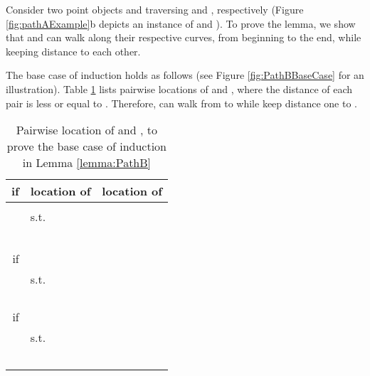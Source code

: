 \documentclass[12pt]{dalthesis}
\def\favoritefont{\bfseries \sffamily}
\def\QED{\ensuremath{{\Box}}}
\def\markatright#1{\leavevmode\unskip\nobreak\quad\hspace*{\fill}{#1}}
\newenvironment{proof}
	{\begin{trivlist}\item[\hskip\labelsep{\favoritefont Proof:}]}
	{\markatright{\QED}\end{trivlist}}
\begin{document}
\begin{proof}



Consider two point objects  and  
traversing  and , respectively (Figure \ref{fig:pathAExample}b depicts an instance of  and ).
To prove the lemma, we show that  and  can walk along
their respective curves, from beginning to
the end, while keeping distance  to each other. 

The base case of induction holds as follows 
(see Figure \ref{fig:PathBBaseCase} for an illustration).
Table \ref{tab:BaseCasePathB} lists  pairwise locations of 
 and , where the distance of each pair is less or equal to .
Therefore,  can walk from  to  while
keep distance one to .

\begin{table}[h]
\centering
\begin{tabular}{ r | l | l  }
if    & location of  & location of   
 \\
\hline
    
&   &   \\
&  				  s.t.   & \\

				&     &    \\
&  				 			       &   \\
&     &   \\
&  				 		      &     \\
&   & 	      \\

\hline
if  
&   &   \\
&  				  s.t.   & \\
&  &  \\
&  &  \\
&  &  \\
&  &  \\

\hline
if  &  &   \\
&  				  s.t.   & \\
&  &  \\
&  &  \\
&  &  \\
&  &  \\
&   & 	      \\

\end{tabular}
\vspace{0.2 in}
\caption{Pairwise location of  and , to prove the base case of induction in Lemma \ref{lemma:PathB} }
\label{tab:BaseCasePathB}
\end{table}






\end{proof}
\end{document}
